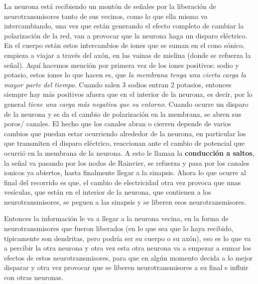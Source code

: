 La neurona está recibiendo un montón de señales por la liberación de neurotransmisores tanto de sus vecinos, como lo que ella misma va intercambiando, 
una vez que están generando el efecto completo de cambiar la polarización de
la red,  van a provocar que la neurona haga un disparo eléctrico. En el cuerpo están estos intercambios de iones que se suman en el cono sónico, empieza a viajar a través del axón,  en las vainas de mielina (donde se refuerza la señal). 
Aquí hacemos mención por primera vez de los iones positivos: sodio y potasio, estos iones lo que hacen es, que \emph{la membrana tenga una cierta carga la mayor parte del tiempo}. Cuando salen 3 sodios entran 2 potasios, entonces siempre hay más positivos afuera que en el interior de la neurona, es decir, por lo general  \emph{tiene una carga más negativa que su entorno}. Cuando ocurre un disparo de la neurona y se da el cambio de polarización en la membrana, se abren sus poros/ canales. El hecho que los canales abran o cierren depende de varios cambios que puedan estar ocurriendo alrededor de la neurona, en particular los que transmiten el disparo eléctrico, reaccionan ante el cambio de potencial que ocurrió en la membrana de la neurona. A esto le llaman la \textbf{conducción a saltos}, la señal va pasando por los nodos de Rainvier, se refuerza y pasa por los canales ionicos ya abiertos, hasta finalmente llegar a la sinapsis. Ahora lo que ocurre al final del recorrido es que, el cambio de electricidad otra vez provoca que unas vesículas, que están en el interior de la neurona,  que contienen a los neurotransmisores, se peguen a las sinapsis y se liberen esos neurotransmisores. 

Entonces la información le va a llegar a la neurona vecina, en la forma de neurotransmisores que fueron liberados (en lo que sea que lo haya recibido, típicamente son dendritas, pero podría ser su cuerpo o su axón), eso es lo que va a percibir la otra neurona y otra vez esta otra neurona va a empezar a sumar los efectos de estos neurotransmisores, para que en algún momento decida a lo mejor disparar y otra vez provocar que se liberen neurotransmisores a su final e influir con otras neuronas.

